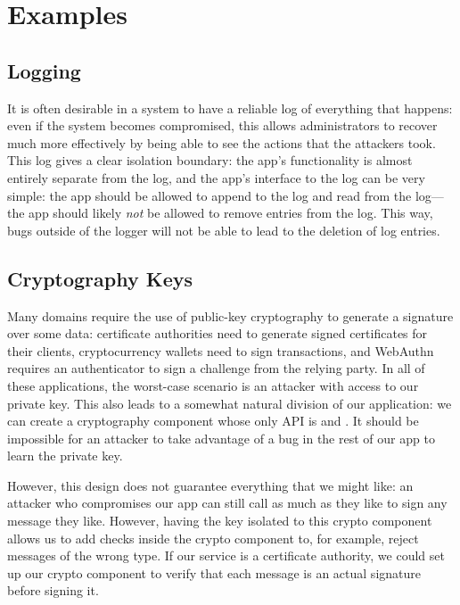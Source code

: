 \section{Examples}
\subsection{Logging}
It is often desirable in a system to have a reliable log of everything that happens: even if the system becomes compromised, this allows administrators to recover much more effectively by being able to see the actions that the attackers took. This log gives a clear isolation boundary: the app's functionality is almost entirely separate from the log, and the app's interface to the log can be very simple: the app should be allowed to append to the log and read from the log---the app should likely \emph{not} be allowed to remove entries from the log. This way, bugs outside of the logger will not be able to lead to the deletion of log entries.

\subsection{Cryptography Keys}
Many domains require the use of public-key cryptography to generate a signature over some data: certificate authorities need to generate signed certificates for their clients, cryptocurrency wallets need to sign transactions, and WebAuthn requires an authenticator to sign a challenge from the relying party. In all of these applications, the worst-case scenario is an attacker with access to our private key. This also leads to a somewhat natural division of our application: we can create a cryptography component whose only API is  and . It should be impossible for an attacker to take advantage of a bug in the rest of our app to learn the private key.

However, this design does not guarantee everything that we might like: an attacker who compromises our app can still call  as much as they like to sign any message they like. However, having the key isolated to this crypto component allows us to add checks inside the crypto component to, for example, reject messages of the wrong type. If our service is a certificate authority, we could set up our crypto component to verify that each message is an actual signature before signing it.


